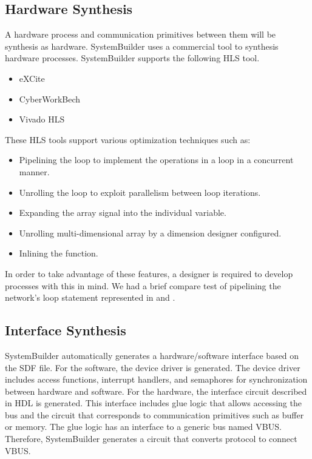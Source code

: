 \subsection{Hardware Synthesis}\label{sec:hwsynthesis}
A hardware process and communication primitives between them will be synthesis as hardware. SystemBuilder uses a commercial tool to synthesis hardware processes. SystemBuilder supports the following HLS tool.

\begin{itemize}
    \item eXCite
    \item CyberWorkBech\cite{waka}
    \item Vivado HLS\cite{vivadohls}
\end{itemize}

These HLS tools support various optimization techniques such as:

\begin{itemize}
  \item Pipelining the loop to implement the operations in a loop in a concurrent manner.
  \item Unrolling the loop to exploit parallelism between loop iterations.
  \item Expanding the array signal into the individual variable.
  \item Unrolling multi-dimensional array by a dimension designer configured.
  \item Inlining the function.
\end{itemize}

In order to take advantage of these features, a designer is required to develop processes with this in mind. We had a brief compare test of pipelining the network's loop statement represented in  and .

\subsection{Interface Synthesis}
SystemBuilder automatically generates a hardware/software interface based on the SDF file. For the software, the device driver is generated. The device driver includes access functions, interrupt handlers, and semaphores for synchronization between hardware and software. For the hardware, the interface circuit described in HDL is generated. This interface includes glue logic that allows accessing the bus and the circuit that corresponds to communication primitives such as buffer or memory. The glue logic has an interface to a generic bus named VBUS. Therefore, SystemBuilder generates a circuit that converts protocol to connect VBUS.

